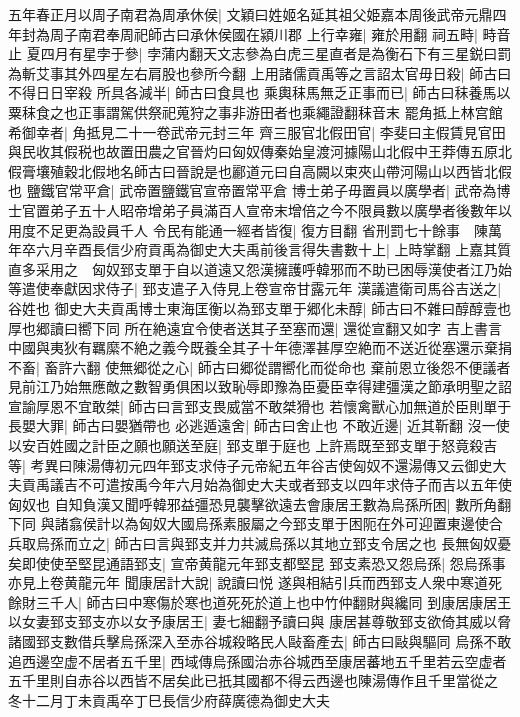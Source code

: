 五年春正月以周子南君為周承休侯|{
	文穎曰姓姬名延其祖父姫嘉本周後武帝元鼎四年封為周子南君奉周祀師古曰承休侯國在潁川郡}
上行幸雍|{
	雍於用翻}
祠五畤|{
	畤音止}
夏四月有星孛于參|{
	孛蒲内翻天文志參為白虎三星直者是為衡石下有三星鋭曰罰為斬艾事其外四星左右肩股也參所今翻}
上用諸儒貢禹等之言詔太官毋日殺|{
	師古曰不得日日宰殺}
所具各減半|{
	師古曰食具也}
乘輿秣馬無乏正事而已|{
	師古曰秣養馬以粟秣食之也正事謂駕供祭祀蒐狩之事非游田者也乘繩證翻秣音末}
罷角抵上林宫館希御幸者|{
	角抵見二十一卷武帝元封三年}
齊三服官北假田官|{
	李斐曰主假賃見官田與民收其假税也故置田農之官晉灼曰匈奴傳秦始皇渡河據陽山北假中王莽傳五原北假膏壤殖穀北假地名師古曰晉說是也酈道元曰自高闕以束夾山帶河陽山以西皆北假也}
鹽鐵官常平倉|{
	武帝置鹽鐵官宣帝置常平倉}
博士弟子毋置員以廣學者|{
	武帝為博士官置弟子五十人昭帝增弟子員滿百人宣帝末增倍之今不限員數以廣學者後數年以用度不足更為設員千人}
令民有能通一經者皆復|{
	復方目翻}
省刑罰七十餘事　陳萬年卒六月辛酉長信少府貢禹為御史大夫禹前後言得失書數十上|{
	上時掌翻}
上嘉其質直多采用之　匈奴郅支單于自以道遠又怨漢擁護呼韓邪而不助已困辱漢使者江乃始等遣使奉獻因求侍子|{
	郅支遣子入侍見上卷宣帝甘露元年}
漢議遣衛司馬谷吉送之|{
	谷姓也}
御史大夫貢禹博士東海匡衡以為郅支單于郷化未醇|{
	師古曰不雜曰醇醇壹也厚也郷讀曰嚮下同}
所在絶遠宜令使者送其子至塞而還|{
	還從宣翻又如字}
吉上書言中國與夷狄有羈縻不絶之義今既養全其子十年德澤甚厚空絶而不送近從塞還示棄捐不畜|{
	畜許六翻}
使無郷從之心|{
	師古曰郷從謂嚮化而從命也}
棄前恩立後怨不便議者見前江乃始無應敵之數智勇俱困以致恥辱即豫為臣憂臣幸得建彊漢之節承明聖之詔宣諭厚恩不宜敢桀|{
	師古曰言郅支畏威當不敢桀猾也}
若懷禽獸心加無道於臣則單于長嬰大罪|{
	師古曰嬰猶帶也}
必逃遁遠舍|{
	師古曰舍止也}
不敢近邊|{
	近其靳翻}
沒一使以安百姓國之計臣之願也願送至庭|{
	郅支單于庭也}
上許焉既至郅支單于怒竟殺吉等|{
	考異曰陳湯傳初元四年郅支求侍子元帝紀五年谷吉使匈奴不還湯傳又云御史大夫貢禹議吉不可遣按禹今年六月始為御史大夫或者郅支以四年求侍子而吉以五年使匈奴也}
自知負漢又聞呼韓邪益彊恐見襲擊欲遠去會康居王數為烏孫所困|{
	數所角翻下同}
與諸翕侯計以為匈奴大國烏孫素服屬之今郅支單于困阨在外可迎置東邊使合兵取烏孫而立之|{
	師古曰言與郅支并力共滅烏孫以其地立郅支令居之也}
長無匈奴憂矣即使使至堅昆通語郅支|{
	宣帝黄龍元年郅支都堅昆}
郅支素恐又怨烏孫|{
	怨烏孫事亦見上卷黄龍元年}
聞康居計大說|{
	說讀曰悦}
遂與相結引兵而西郅支人衆中寒道死餘財三千人|{
	師古曰中寒傷於寒也道死死於道上也中竹仲翻財與纔同}
到康居康居王以女妻郅支郅支亦以女予康居王|{
	妻七細翻予讀曰與}
康居甚尊敬郅支欲倚其威以脅諸國郅支數借兵擊烏孫深入至赤谷城殺略民人敺畜產去|{
	師古曰敺與驅同}
烏孫不敢追西邊空虚不居者五千里|{
	西域傳烏孫國治赤谷城西至康居蕃地五千里若云空虚者五千里則自赤谷以西皆不居矣此已扺其國都不得云西邊也陳湯傳作且千里當從之}
冬十二月丁未貢禹卒丁巳長信少府薛廣德為御史大夫

